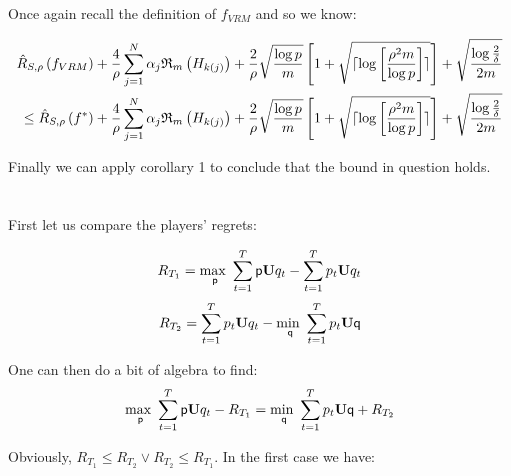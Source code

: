\documentclass[]{article}
\begin{document}
\noindent Once again recall the definition of $f_{VRM}$ and so we know:

\begin{equation}
\begin{split}
\hat{R}_{S,\rho}\left(f_{VRM}\right) + \frac{4}{\rho} \sum_{j=1}^{N} \alpha_j \mathfrak{R}_m \left( H_{k \left( j \right)} \right) + \frac{2}{\rho} \sqrt{\frac{\log p}{m}} \left[1+\sqrt{\lceil \log \left[ \frac{\rho^2 m}{\log p} \right]\rceil}\right] + \sqrt{\frac{\log \frac{2}{\delta}}{2m}} \\
\le \hat{R}_{S,\rho}\left(f^*\right) + \frac{4}{\rho} \sum_{j=1}^{N} \alpha_j \mathfrak{R}_m \left( H_{k \left( j \right)} \right) + \frac{2}{\rho} \sqrt{\frac{\log p}{m}} \left[1+\sqrt{\lceil \log \left[ \frac{\rho^2 m}{\log p} \right]\rceil}\right] + \sqrt{\frac{\log \frac{2}{\delta}}{2m}}
\end{split}
\notag
\end{equation}

\noindent Finally we can apply corollary 1 to conclude that the bound in question holds.	

\section{}
\subsection{}

First let us compare the players' regrets:

\begin{equation}
	R_{T_1} = \underset{\mathsf{p}}{\text{max }} \sum_{t=1}^{T} \mathsf{p} \textbf{U} q_t - \sum_{t=1}^{T} p_t \textbf{U} q_t
\notag
\end{equation}
\begin{equation}
	R_{T_2} = \sum_{t=1}^{T} p_t \textbf{U} q_t - \underset{\mathsf{q}}{\text{min }} \sum_{t=1}^{T} p_t \textbf{U} \mathsf{q}
\notag
\end{equation}

\noindent One can then do a bit of algebra to find:
\begin{equation}
	\underset{\mathsf{p}}{\text{max }} \sum_{t=1}^{T} \mathsf{p} \textbf{U} q_t - R_{T_1} = \underset{\mathsf{q}}{\text{min }} \sum_{t=1}^{T} p_t \textbf{U} \mathsf{q} + R_{T_2}
\notag
\end{equation}

\noindent Obviously, $R_{T_1} \le R_{T_2} \lor R_{T_2} \le R_{T_1}$. In the first case we have:
	
\end{document}
